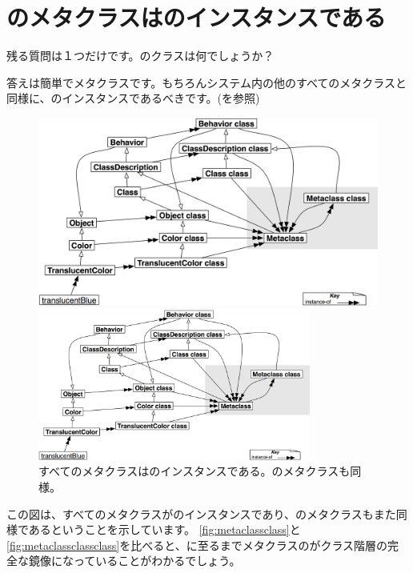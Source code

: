 \documentclass[a4paper,10pt,twoside]{book}
\begin{document}
\section{のメタクラスはのインスタンスである}

残る質問は１つだけです。のクラスは何でしょうか？

答えは簡単でメタクラスです。もちろんシステム内の他のすべてのメタクラスと同様に、のインスタンスであるべきです。(を参照)

\begin{center}
\begin{figure}
\ifluluelse
	{\centerline{\includegraphics[width=\textwidth]{TranslucentMetaclassClassClass}}}
	{\centerline{\includegraphics[width=0.8\textwidth]{TranslucentMetaclassClassClass}}}
\caption{すべてのメタクラスはのインスタンスである。のメタクラスも同様。}
\end{figure}
\end{center}

この図は、すべてのメタクラスがのインスタンスであり、のメタクラスもまた同様であるということを示しています。
\ref{fig:metaclassclass}と\ref{fig:metaclassclassclass}を比べると、に至るまでメタクラスのがクラス階層の完全な鏡像になっていることがわかるでしょう。
\end{document}
